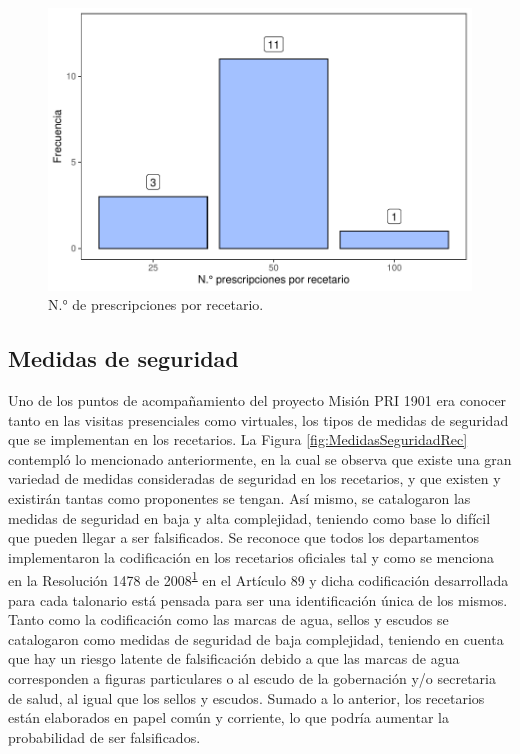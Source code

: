 \documentclass[
]{book}
\begin{document}
\begin{figure}

{\centering \includegraphics[width=0.85\linewidth]{InformeFinal_files/figure-latex/existenciaRecetarios4-1} 

}

\caption{N.° de prescripciones por recetario.}\label{fig:existenciaRecetarios4}
\end{figure}

\hypertarget{medidas-de-seguridad}{%
\subsection{Medidas de seguridad}\label{medidas-de-seguridad}}

Uno de los puntos de acompañamiento del proyecto Misión PRI 1901 era conocer tanto en las visitas presenciales como virtuales, los tipos de medidas de seguridad que se implementan en los recetarios. La Figura \ref{fig:MedidasSeguridadRec} contempló lo mencionado anteriormente, en la cual se observa que existe una gran variedad de medidas consideradas de seguridad en los recetarios, y que existen y existirán tantas como proponentes se tengan. Así mismo, se catalogaron las medidas de seguridad en baja y alta complejidad, teniendo como base lo difícil que pueden llegar a ser falsificados. Se reconoce que todos los departamentos implementaron la codificación en los recetarios oficiales tal y como se menciona en la Resolución 1478 de 2008\textsuperscript{\protect\hyperlink{ref-MSPS1478-2006}{1}} en el Artículo 89 y dicha codificación desarrollada para cada talonario está pensada para ser una identificación única de los mismos.
Tanto como la codificación como las marcas de agua, sellos y escudos se catalogaron como medidas de seguridad de baja complejidad, teniendo en cuenta que hay un riesgo latente de falsificación debido a que las marcas de agua corresponden a figuras particulares o al escudo de la gobernación y/o secretaria de salud, al igual que los sellos y escudos. Sumado a lo anterior, los recetarios están elaborados en papel común y corriente, lo que podría aumentar la probabilidad de ser falsificados.
\end{document}
